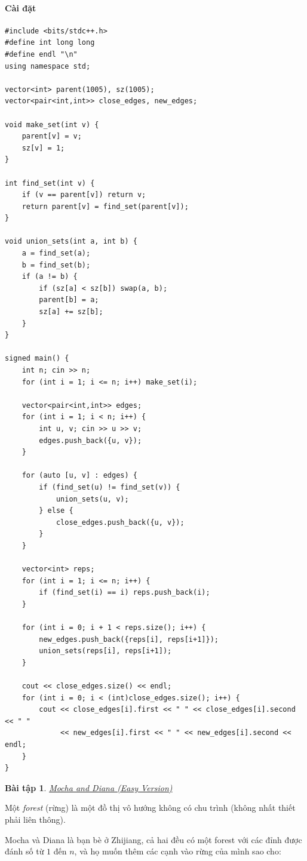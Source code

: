 \documentclass{article}
\newtheorem{baitap}{Bài tập}
\begin{document}
\paragraph{Cài đặt}
\begin{lstlisting}
#include <bits/stdc++.h>
#define int long long
#define endl "\n"
using namespace std;

vector<int> parent(1005), sz(1005);
vector<pair<int,int>> close_edges, new_edges;

void make_set(int v) {
    parent[v] = v;
    sz[v] = 1;
}

int find_set(int v) {
    if (v == parent[v]) return v;
    return parent[v] = find_set(parent[v]);
}

void union_sets(int a, int b) {
    a = find_set(a);
    b = find_set(b);
    if (a != b) {
        if (sz[a] < sz[b]) swap(a, b);
        parent[b] = a;
        sz[a] += sz[b];
    }
}

signed main() {
    int n; cin >> n;
    for (int i = 1; i <= n; i++) make_set(i);

    vector<pair<int,int>> edges;
    for (int i = 1; i < n; i++) {
        int u, v; cin >> u >> v;
        edges.push_back({u, v});
    }

    for (auto [u, v] : edges) {
        if (find_set(u) != find_set(v)) {
            union_sets(u, v);
        } else {
            close_edges.push_back({u, v});
        }
    }

    vector<int> reps;
    for (int i = 1; i <= n; i++) {
        if (find_set(i) == i) reps.push_back(i);
    }

    for (int i = 0; i + 1 < reps.size(); i++) {
        new_edges.push_back({reps[i], reps[i+1]});
        union_sets(reps[i], reps[i+1]);
    }

    cout << close_edges.size() << endl;
    for (int i = 0; i < (int)close_edges.size(); i++) {
        cout << close_edges[i].first << " " << close_edges[i].second << " " 
             << new_edges[i].first << " " << new_edges[i].second << endl;
    }
}
\end{lstlisting}

\begin{baitap}
    \href{https://codeforces.com/contest/1559/problem/D1}{Mocha and Diana (Easy Version)}
\end{baitap}

Một \emph{forest} (rừng) là một đồ thị vô hướng không có chu trình (không nhất thiết phải liên thông).  

Mocha và Diana là bạn bè ở Zhijiang, cả hai đều có một forest với các đỉnh được đánh số từ $1$ đến $n$, và họ muốn thêm các cạnh vào rừng của mình sao cho:  
\end{document}
